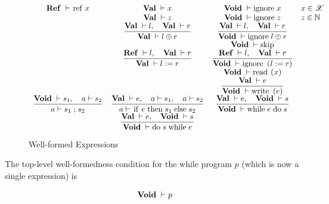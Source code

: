 \documentclass{article}
\newcommand{\trule}[2]{\dfrac{#1}{#2}}
\newcommand{\withenv}[2]{{#1}\vdash{#2}}
\newcommand{\llang}[1]{\mbox{\lstinline[mathescape]|#1|}}
\theoremstyle{definition}
\begin{document}
\begin{figure}
\renewcommand{\arraystretch}{2}
\[
  \begin{array}{cccl}
    \withenv{\Ref}{\llang{ref $\;x$}} & \withenv{\Val}{x}& \withenv{\Void}{\llang{ignore $\;x$}} & x \in \mathscr X\\
                                      & \withenv{\Val}{z}& \withenv{\Void}{\llang{ignore $\;z$}} & z \in \mathbb N \\
                                      & \trule{\withenv{\Val}{l},\quad\withenv{\Val}{r}}
                                              {\withenv{\Val}{l\oplus r}} &
                                        \trule{\withenv{\Val}{l},\quad\withenv{\Val}{r}}
                                              {\withenv{\Void}{\llang{ignore $\;l\oplus r$}}}    & \\
                                      &                  & \withenv{\Void}{\llang{skip}}         & \\
                                      & \trule{\withenv{\Ref}{l},\quad\withenv{\Val}{r}}
                                              {\withenv{\Val}{\llang{$l\;$ := $\; r$}}} &
                                        \trule{\withenv{\Ref}{l},\quad\withenv{\Val}{r}}
                                              {\withenv{\Void}{\llang{ignore ($l\;$ := $\; r$})}} & \\
                                      &                  & \withenv{\Void}{\llang{read ($x$)}} & \\
                                      &                  & \trule{\withenv{\Val}{e}}{\withenv{\Void}{\llang{write ($e$)}}} & \\[2mm]
      \trule{\withenv{\Void}{s_1},\quad\withenv{a}{s_2}}{\withenv{a}{\llang{$s_1\;$;$\;s_2$}}}&
      \trule{\withenv{\Val}{e},\quad\withenv{a}{s_1},\quad\withenv{a}{s_2}}{\withenv{a}{\llang{if $\;e\;$ then $\;s_1\;$ else $\;s_2$}}}&
      \trule{\withenv{\Val}{e},\quad\withenv{\Void}{s}}{\withenv{\Void}{\llang{while $\;e\;$ do $\;s$}}}&       \\[2mm]
       & \trule{\withenv{\Val}{e},\quad\withenv{\Void}{s}}{\withenv{\Void}{\llang{do $\;s\;$ while $\;e$}}} & &
  \end{array}
  \]
  \caption{Well-formed Expressions}
  \label{well_formed}
\end{figure}

The top-level well-formedness condition for the while program $p$ (which is now a single expression) is

\[
\withenv{\Void}{p}
\]
\end{document}
